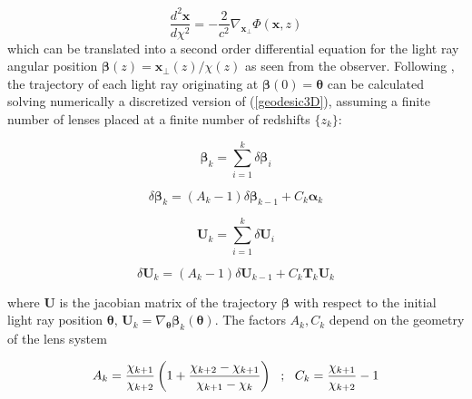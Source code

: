 \documentclass[reprint,aps,prd,superscriptaddress,showkeys,showpacs]{revtex4-1}
\newcommand{\bb}[1]{\mathbf{#1}}
\begin{document}
\begin{equation}
\label{geodesic3D}
\frac{d^2\bb{x}}{d\chi^2} = -\frac{2}{c^2}\nabla_\bb{x_\perp}\Phi(\bb{x},z)
\end{equation}
%
which can be translated into a second order differential equation for the light ray angular position $\pmb{\beta}(z)=\bb{x}_\perp(z)/\chi(z)$ as seen from the observer. Following \citep{RayTracingHartlap}, the trajectory of each light ray originating at $\pmb{\beta}(0)=\pmb{\theta}$ can be calculated solving numerically a discretized version of (\ref{geodesic3D}), assuming a finite number of lenses placed at a finite number of redshifts $\{z_k\}$:
%

\begin{widetext}

\begin{equation}
\label{geodesic2D}
\pmb{\beta}_{k} = \sum_{i=1}^k\delta\pmb{\beta}_i 
\end{equation}

\begin{equation}
\delta\pmb{\beta}_k = (A_k-1)\delta\pmb{\beta}_{k-1} + C_k\pmb{\alpha}_k 
\end{equation}

\begin{equation}
\bb{U}_{k} = \sum_{i=1}^k\delta\bb{U}_i 
\end{equation}

\begin{equation}
\delta\bb{U}_k = (A_k-1)\delta\bb{U}_{k-1} + C_k\bb{T}_k\bb{U}_k
\end{equation}

\end{widetext}
%
where $\bb{U}$ is the jacobian matrix of the trajectory $\pmb{\beta}$ with respect to the initial light ray position $\pmb{\theta}$, $\bb{U}_k=\nabla_{\pmb{\theta}}\pmb{\beta}_k(\pmb{\theta})$. The factors $A_k,C_k$ depend on the geometry of the lens system

\begin{widetext}

\begin{equation}
A_k = \frac{\chi_{k+1}}{\chi_{k+2}}\left(1 + \frac{\chi_{k+2}-\chi_{k+1}}{\chi_{k+1}-\chi_k}\right) \,\,\,\, ; \,\,\,\, C_k = \frac{\chi_{k+1}}{\chi_{k+2}} - 1 \\ \\
\end{equation} 

\end{widetext}
\end{document}
